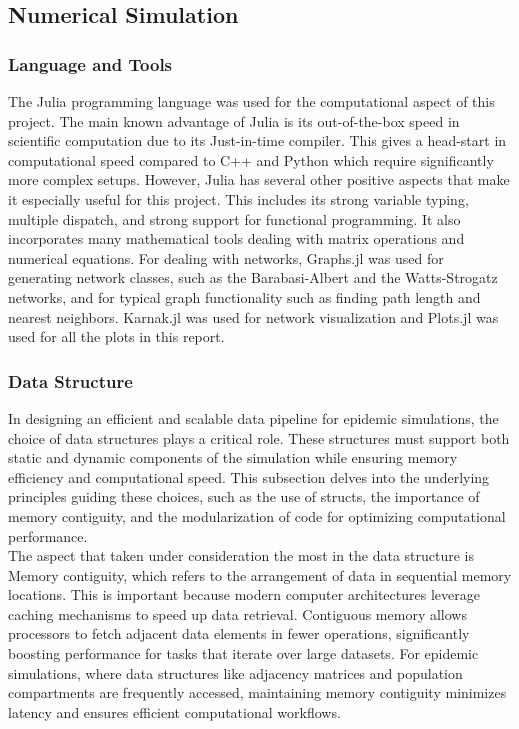 \subsection{Numerical Simulation}
\subsubsection{Language and Tools}
The Julia programming language was used for the computational aspect of this project. The main known advantage of Julia is its out-of-the-box speed in scientific computation due to its  Just-in-time compiler. This gives a head-start in computational speed compared to C++ and Python which require significantly more complex setups. However, Julia has several other positive aspects that make it especially useful for this project. This includes its strong variable typing, multiple dispatch, and strong support for functional programming. It also incorporates many mathematical tools dealing with matrix operations and numerical equations. For dealing with networks, Graphs.jl was used for generating network classes, such as the Barabasi-Albert and the Watts-Strogatz networks, and for typical graph functionality such as finding path length and nearest neighbors. Karnak.jl was used for network visualization and Plots.jl was used for all the plots in this report.
\subsubsection{Data Structure}
In designing an efficient and scalable data pipeline for epidemic simulations, the choice of data structures plays a critical role. These structures must support both static and dynamic components of the simulation while ensuring memory efficiency and computational speed. This subsection delves into the underlying principles guiding these choices, such as the use of structs, the importance of memory contiguity, and the modularization of code for optimizing computational performance.\\

The aspect that taken under consideration the most in the data structure is Memory contiguity, which refers to the arrangement of data in sequential memory locations. This is important because modern computer architectures leverage caching mechanisms to speed up data retrieval. Contiguous memory allows processors to fetch adjacent data elements in fewer operations, significantly boosting performance for tasks that iterate over large datasets. For epidemic simulations, where data structures like adjacency matrices and population compartments are frequently accessed, maintaining memory contiguity minimizes latency and ensures efficient computational workflows.\\

